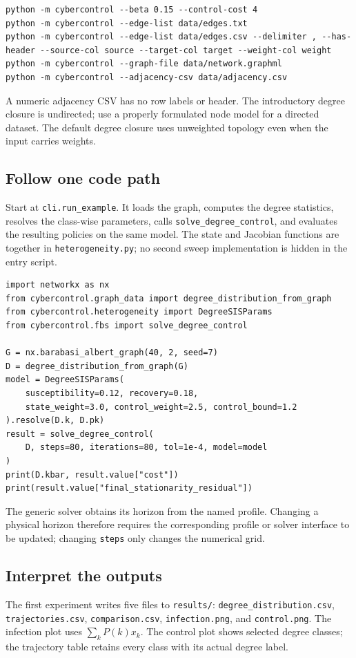 \documentclass[11pt,a4paper]{article}
\theoremstyle{definition}
\theoremstyle{remark}
\begin{document}
\begin{lstlisting}[language={}]
python -m cybercontrol --beta 0.15 --control-cost 4
python -m cybercontrol --edge-list data/edges.txt
python -m cybercontrol --edge-list data/edges.csv --delimiter , --has-header --source-col source --target-col target --weight-col weight
python -m cybercontrol --graph-file data/network.graphml
python -m cybercontrol --adjacency-csv data/adjacency.csv
\end{lstlisting}
A numeric adjacency CSV has no row labels or header. The introductory degree closure is undirected; use a properly formulated node model for a directed dataset. The default degree closure uses unweighted topology even when the input carries weights.

\subsection{Follow one code path}
Start at \texttt{cli.run\_example}. It loads the graph, computes the degree statistics, resolves the class-wise parameters, calls \texttt{solve\_degree\_control}, and evaluates the resulting policies on the same model. The state and Jacobian functions are together in \texttt{heterogeneity.py}; no second sweep implementation is hidden in the entry script.

\begin{lstlisting}[caption={Run the same mathematical building blocks from Python}]
import networkx as nx
from cybercontrol.graph_data import degree_distribution_from_graph
from cybercontrol.heterogeneity import DegreeSISParams
from cybercontrol.fbs import solve_degree_control

G = nx.barabasi_albert_graph(40, 2, seed=7)
D = degree_distribution_from_graph(G)
model = DegreeSISParams(
    susceptibility=0.12, recovery=0.18,
    state_weight=3.0, control_weight=2.5, control_bound=1.2
).resolve(D.k, D.pk)
result = solve_degree_control(
    D, steps=80, iterations=80, tol=1e-4, model=model
)
print(D.kbar, result.value["cost"])
print(result.value["final_stationarity_residual"])
\end{lstlisting}
The generic solver obtains its horizon from the named profile. Changing a physical horizon therefore requires the corresponding profile or solver interface to be updated; changing \texttt{steps} only changes the numerical grid.

\subsection{Interpret the outputs}
The first experiment writes five files to \texttt{results/}: \texttt{degree\_distribution.csv}, \texttt{trajectories.csv}, \texttt{comparison.csv}, \texttt{infection.png}, and \texttt{control.png}. The infection plot uses $\sum_kP(k)x_k$. The control plot shows selected degree classes; the trajectory table retains every class with its actual degree label.
\end{document}
